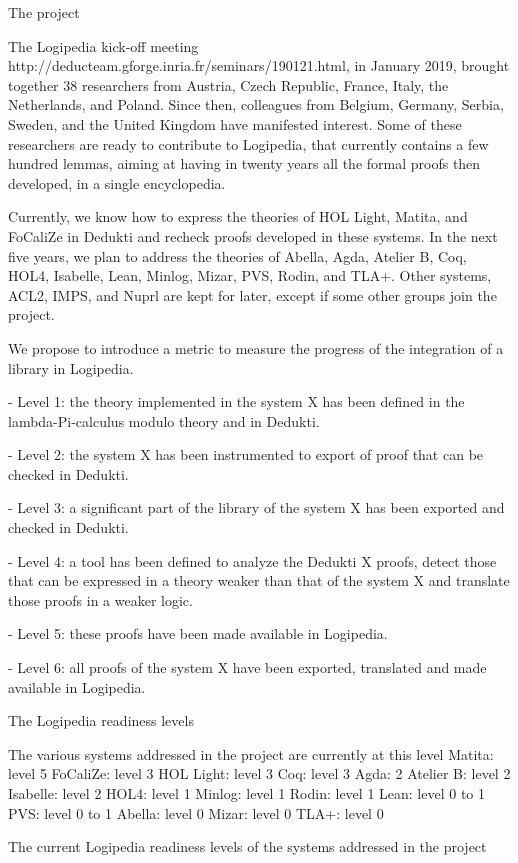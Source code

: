The project

The Logipedia kick-off meeting
http://deducteam.gforge.inria.fr/seminars/190121.html, in January
2019, brought together 38 researchers from Austria, Czech Republic,
France, Italy, the Netherlands, and Poland. Since then, colleagues
from Belgium, Germany, Serbia, Sweden, and the United Kingdom have
manifested interest. Some of these researchers are ready to contribute
to Logipedia, that currently contains a few hundred lemmas, aiming at
having in twenty years all the formal proofs then developed, in a
single encyclopedia.

Currently, we know how to express the theories of HOL Light, Matita,
and FoCaliZe in Dedukti and recheck proofs developed in these
systems. In the next five years, we plan to address the theories of
Abella, Agda, Atelier B, Coq, HOL4, Isabelle, Lean, Minlog,
Mizar, PVS, Rodin, and TLA+. Other systems, ACL2, IMPS, and Nuprl are
kept for later, except if some other groups join the project.


We propose to introduce a metric to measure the progress of the
integration of a library in Logipedia.


- Level 1: the theory implemented in the system X has been defined in
the lambda-Pi-calculus modulo theory and in Dedukti.

- Level 2: the system X has been instrumented to export of proof that
can be checked in Dedukti.

- Level 3: a significant part of the library of the system X has been exported and checked in Dedukti.

- Level 4: a tool has been defined to analyze the Dedukti X proofs,
detect those that can be expressed in a theory weaker than that of the
system X and translate those proofs in a weaker logic.

- Level 5: these proofs have been made available in Logipedia.

- Level 6: all proofs of the system X have been exported, translated
and made available in Logipedia.

The Logipedia readiness levels

The various systems addressed in the project are currently at this level 
Matita: level 5
FoCaliZe: level 3
HOL Light: level 3
Coq: level 3
Agda: 2
Atelier B: level 2
Isabelle: level 2
HOL4: level 1
Minlog: level 1
Rodin: level 1
Lean: level 0 to 1
PVS: level 0 to 1
Abella: level 0
Mizar: level 0
TLA+: level 0

The current Logipedia readiness levels of the systems addressed in the project

